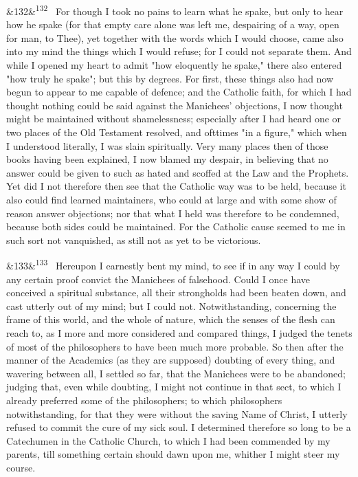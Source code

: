 \documentclass[12pt]{article}
\newcommand{\para}[1][]{\par\noindent\ifx&#1&\else\textsuperscript{\footnotesize #1}~\fi}
\begin{document}
\para[132] For though I took no pains to learn what he spake, but only to hear how he spake (for that empty care alone was left me, despairing of a way, open for man, to Thee), yet together with the words which I would choose, came also into my mind the things which I would refuse; for I could not separate them. And while I opened my heart to admit "how eloquently he spake," there also entered "how truly he spake"; but this by degrees. For first, these things also had now begun to appear to me capable of defence; and the Catholic faith, for which I had thought nothing could be said against the Manichees' objections, I now thought might be maintained without shamelessness; especially after I had heard one or two places of the Old Testament resolved, and ofttimes "in a figure," which when I understood literally, I was slain spiritually. Very many places then of those books having been explained, I now blamed my despair, in believing that no answer could be given to such as hated and scoffed at the Law and the Prophets. Yet did I not therefore then see that the Catholic way was to be held, because it also could find learned maintainers, who could at large and with some show of reason answer objections; nor that what I held was therefore to be condemned, because both sides could be maintained. For the Catholic cause seemed to me in such sort not vanquished, as still not as yet to be victorious.

\para[133] Hereupon I earnestly bent my mind, to see if in any way I could by any certain proof convict the Manichees of falsehood. Could I once have conceived a spiritual substance, all their strongholds had been beaten down, and cast utterly out of my mind; but I could not. Notwithstanding, concerning the frame of this world, and the whole of nature, which the senses of the flesh can reach to, as I more and more considered and compared things, I judged the tenets of most of the philosophers to have been much more probable. So then after the manner of the Academics (as they are supposed) doubting of every thing, and wavering between all, I settled so far, that the Manichees were to be abandoned; judging that, even while doubting, I might not continue in that sect, to which I already preferred some of the philosophers; to which philosophers notwithstanding, for that they were without the saving Name of Christ, I utterly refused to commit the cure of my sick soul. I determined therefore so long to be a Catechumen in the Catholic Church, to which I had been commended by my parents, till something certain should dawn upon me, whither I might steer my course.
\end{document}
